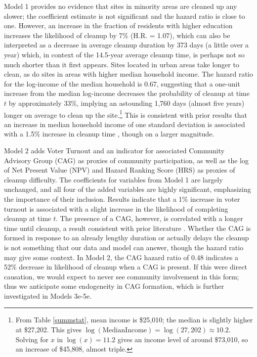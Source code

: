 \documentclass[12pt]{article}
\begin{document}
Model 1 provides no evidence that sites in minority areas are cleaned up any slower; the coefficient estimate is not significant and the hazard ratio is close to one. However, an increase in the fraction of residents with higher education increases the likelihood of cleanup by 7\% (H.R. = 1.07), which can also be interpreted as a decrease in average cleanup duration by 373 days (a little over a year) which, in context of the 14.5-year average cleanup time, is perhaps not so much shorter than it first appears. Sites located in urban areas take longer to clean, as do sites in areas with higher median household income. The hazard ratio for the log-income of the median household is 0.67, suggesting that a one-unit increase from the median log-income decreases the probability of cleanup at time $t$ by approximately 33\%, implying an astounding 1,760 days (almost five years) longer on average to clean up the site.\footnote{From Table \ref{summstat}, mean income is \$25,010; the median is slightly higher at \$27,202. This gives $\log(\mathrm{Median Income})=\log(27,202)\approx10.2$. Solving for $x$ in $\log(x) = 11.2$ gives an income level of around \$73,010, so an increase of \$45,808, almost triple.} This is consistent with prior results that an increase in median household income of one standard deviation is associated with a 1.5\% increase in cleanup time \parencite{Sigman2001}, though on a larger magnitude. 

Model 2 adds Voter Turnout and an indicator for associated Community Advisory Group (CAG) as proxies of community participation, as well as the log of Net Present Value (NPV) and Hazard Ranking Score (HRS) as proxies of cleanup difficulty. The coefficients for variables from Model 1 are largely unchanged, and all four of the added variables are highly significant, emphasizing the importance of their inclusion. Results indicate that a 1\% increase in voter turnout is associated with a slight increase in the likelihood of completing cleanup at time $t$. The presence of a CAG, however, is correlated with a longer time until cleanup, a result consistent with prior literature \parencite{daley2004policy}. Whether the CAG is formed in response to an already lengthy duration or actually delays the cleanup is not something that our data and model can answer, though the hazard ratio may give some context. In Model 2, the CAG hazard ratio of 0.48 indicates a 52\% decrease in likelihood of cleanup when a CAG is present. If this were direct causation, we would expect to never see community involvement in this form; thus we anticipate some endogeneity in CAG formation, which is further investigated in Models 3e-5e.
\end{document}
